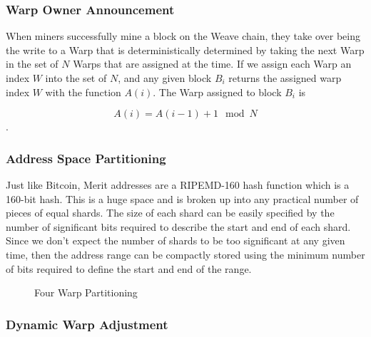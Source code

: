 \documentclass{article}
\begin{document}
\subsubsection{Warp Owner Announcement}

When miners successfully mine a block on the Weave chain, they take over being
the write to a Warp that is deterministically determined by taking the next Warp
in the set of $N$ Warps that are assigned at the time. If we assign each
Warp an index $W$ into the set of $N$, and any given block $B_{i}$ returns the assigned warp index $W$ with the function $A(i)$. The Warp assigned to block $B_{i}$ is 

    $$A(i) = A(i-1)+1 \mod N$$.

\subsubsection{Address Space Partitioning}

Just like Bitcoin, Merit addresses are a RIPEMD-160 hash function which is a 160-bit
hash. This is a huge space and is broken up into any practical number
of pieces of equal shards. The size of each shard can be easily specified by the
number of significant bits required to describe the start and end of each shard.
Since we don't expect the number of shards to be too significant at any given time,
then the address range can be compactly stored using the minimum number of bits
required to define the start and end of the range.

\begin{figure}[H]
    \begin{center}
    \end{center}
    \caption{Four Warp Partitioning}
\end{figure}

\subsubsection{Dynamic Warp Adjustment}
\end{document}
